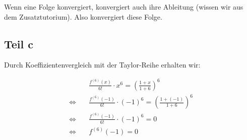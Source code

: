 \documentclass[a4paper,german,12pt,smallheadings]{scrartcl}
\begin{document}
Wenn eine Folge konvergiert, konvergiert auch ihre Ableitung (wissen wir aus
dem Zusatztutorium).  Also konvergiert diese Folge.

\subsection*{Teil c}
Durch Koeffizientenvergleich mit der Taylor-Reihe erhalten wir:

\begin{align*}
  &\frac{f^{(6)}(x)}{6!}\cdot x^6 = \left(\frac{1+x}{1+6}\right)^6 \\
  \Leftrightarrow\quad &\frac{f^{(6)}(-1)}{6!}\cdot (-1)^6 = \left(\frac{1+(-1)}{1+6}\right)^6 \\
  \Leftrightarrow\quad &\frac{f^{(6)}(-1)}{6!}\cdot (-1)^6 = 0 \\
  \Leftrightarrow\quad &f^{(6)}(-1) = 0 \\
\end{align*}
\end{document}
